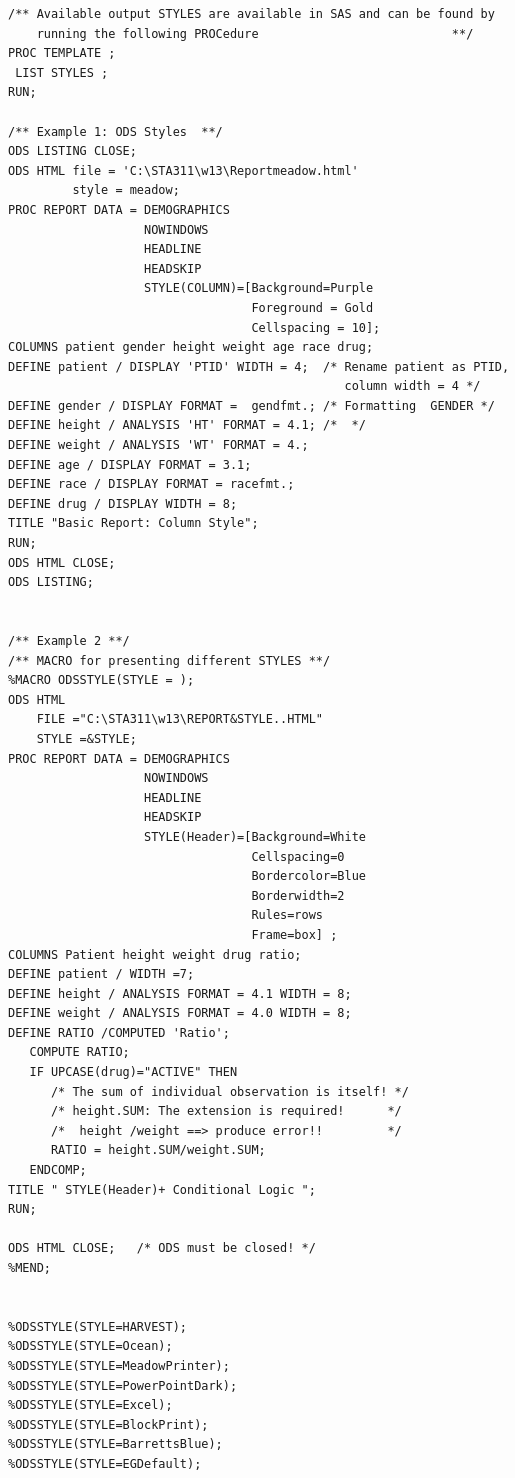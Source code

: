 \documentclass[
]{book}
\begin{document}
\begin{verbatim}
/** Available output STYLES are available in SAS and can be found by
    running the following PROCedure                           **/
PROC TEMPLATE ;
 LIST STYLES ;
RUN; 

/** Example 1: ODS Styles  **/
ODS LISTING CLOSE;
ODS HTML file = 'C:\STA311\w13\Reportmeadow.html'
         style = meadow;
PROC REPORT DATA = DEMOGRAPHICS
                   NOWINDOWS
                   HEADLINE
                   HEADSKIP
                   STYLE(COLUMN)=[Background=Purple 
                                  Foreground = Gold 
                                  Cellspacing = 10];
COLUMNS patient gender height weight age race drug;
DEFINE patient / DISPLAY 'PTID' WIDTH = 4;  /* Rename patient as PTID, 
                                               column width = 4 */
DEFINE gender / DISPLAY FORMAT =  gendfmt.; /* Formatting  GENDER */
DEFINE height / ANALYSIS 'HT' FORMAT = 4.1; /*  */
DEFINE weight / ANALYSIS 'WT' FORMAT = 4.;
DEFINE age / DISPLAY FORMAT = 3.1;
DEFINE race / DISPLAY FORMAT = racefmt.;
DEFINE drug / DISPLAY WIDTH = 8;
TITLE "Basic Report: Column Style";
RUN;
ODS HTML CLOSE;
ODS LISTING;


/** Example 2 **/
/** MACRO for presenting different STYLES **/
%MACRO ODSSTYLE(STYLE = );
ODS HTML
    FILE ="C:\STA311\w13\REPORT&STYLE..HTML"
    STYLE =&STYLE;
PROC REPORT DATA = DEMOGRAPHICS
                   NOWINDOWS
                   HEADLINE
                   HEADSKIP
                   STYLE(Header)=[Background=White 
                                  Cellspacing=0
                                  Bordercolor=Blue 
                                  Borderwidth=2
                                  Rules=rows 
                                  Frame=box] ; 
COLUMNS Patient height weight drug ratio;
DEFINE patient / WIDTH =7;
DEFINE height / ANALYSIS FORMAT = 4.1 WIDTH = 8;  
DEFINE weight / ANALYSIS FORMAT = 4.0 WIDTH = 8;
DEFINE RATIO /COMPUTED 'Ratio';
   COMPUTE RATIO;
   IF UPCASE(drug)="ACTIVE" THEN
      /* The sum of individual observation is itself! */
      /* height.SUM: The extension is required!      */
      /*  height /weight ==> produce error!!         */
      RATIO = height.SUM/weight.SUM; 
   ENDCOMP;
TITLE " STYLE(Header)+ Conditional Logic ";
RUN;

ODS HTML CLOSE;   /* ODS must be closed! */
%MEND; 


%ODSSTYLE(STYLE=HARVEST);
%ODSSTYLE(STYLE=Ocean);
%ODSSTYLE(STYLE=MeadowPrinter);
%ODSSTYLE(STYLE=PowerPointDark);
%ODSSTYLE(STYLE=Excel);
%ODSSTYLE(STYLE=BlockPrint);
%ODSSTYLE(STYLE=BarrettsBlue);
%ODSSTYLE(STYLE=EGDefault);
\end{verbatim}
\end{document}
